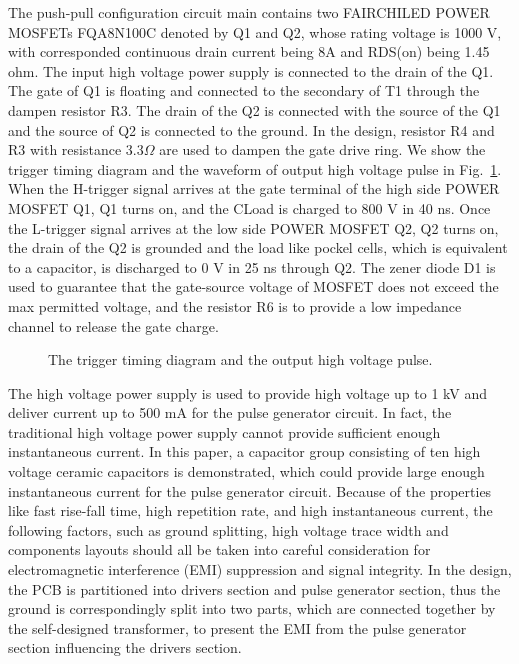 \documentclass[aip,rsi,reprint,graphicx]{revtex4-1} %
\begin{document}
The push-pull configuration circuit main contains two FAIRCHILED POWER MOSFETs FQA8N100C denoted by Q1 and Q2, whose rating voltage is 1000 V, with corresponded continuous drain current being 8A and RDS(on) being 1.45 ohm.
The input high voltage power supply is connected to the drain of the Q1. The gate of Q1 is floating and connected to the secondary of T1 through the dampen resistor R3. 
The drain of the Q2 is connected with the source of the Q1 and the source of Q2 is connected to the ground. 
In the design, resistor R4 and R3 with resistance $3.3 \Omega$ are used to dampen the gate drive ring.
We show the trigger timing diagram and the waveform of output high voltage pulse in Fig.~\ref{FIG2}. 
When the H-trigger signal arrives at the gate terminal of the high side POWER MOSFET Q1, Q1 turns on, and the CLoad is charged to 800 V in 40 ns. 
Once the L-trigger signal arrives at the low side POWER MOSFET Q2, Q2 turns on, the drain of the Q2 is grounded and the load like pockel cells, which is equivalent to a capacitor, is discharged to 0 V in 25 ns through Q2. 
The zener diode D1 is used to guarantee that the gate-source voltage of MOSFET does not exceed the max permitted voltage, and the resistor R6 is to provide a low impedance channel to release the gate charge.
\begin{figure}[hbt]
\caption{The trigger timing diagram and the output high voltage pulse. \label{FIG2}}%
\end{figure}
	The high voltage power supply is used to provide high voltage up to 1 kV and deliver current up to 500 mA for the pulse generator circuit. 
In fact, the traditional high voltage power supply cannot provide sufficient enough instantaneous current. 
In this paper, a capacitor group consisting of ten high voltage ceramic capacitors is demonstrated, which could provide large enough instantaneous current for the pulse generator circuit.
Because of the properties like fast rise-fall time, high repetition rate, and high instantaneous current, the following factors,  such as ground splitting, high voltage trace width and components layouts should all be taken into careful consideration for electromagnetic interference (EMI) suppression and signal integrity.
In the design, the PCB is partitioned into drivers section and pulse generator section, thus the ground is correspondingly split into two parts, which are connected together by the self-designed transformer, to present the EMI from the pulse generator section influencing the drivers section.
\end{document}
